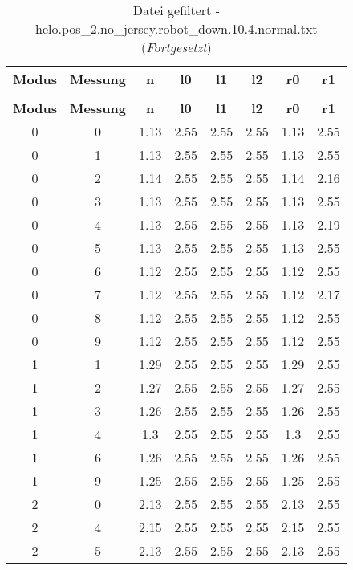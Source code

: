 \begin{longtable}{|c|c||c||c|c|c||c|c|}
	\caption{Datei gefiltert - helo.pos\_2.no\_jersey.robot\_down.10.4.normal.txt} \label{tab:helo.pos-2.no-jersey.robot-down.10.4.normal.txt} \\ \hline
	\textbf{Modus} & \textbf{Messung} & \textbf{n} & \textbf{l0} & \textbf{l1} & \textbf{l2} & \textbf{r0} & \textbf{r1}\\ \hline
	\endfirsthead
	\caption[]{Datei gefiltert - helo.pos\_2.no\_jersey.robot\_down.10.4.normal.txt (\emph{Fortgesetzt})} \\ \hline
	\textbf{Modus} & \textbf{Messung} & \textbf{n} & \textbf{l0} & \textbf{l1} & \textbf{l2} & \textbf{r0} & \textbf{r1}\\ \hline
	\endhead
	0 & 0 & 1.13 & 2.55 & 2.55 & 2.55 & 1.13 & 2.55 \\ \hline
	0 & 1 & 1.13 & 2.55 & 2.55 & 2.55 & 1.13 & 2.55 \\ \hline
	0 & 2 & 1.14 & 2.55 & 2.55 & 2.55 & 1.14 & 2.16 \\ \hline
	0 & 3 & 1.13 & 2.55 & 2.55 & 2.55 & 1.13 & 2.55 \\ \hline
	0 & 4 & 1.13 & 2.55 & 2.55 & 2.55 & 1.13 & 2.19 \\ \hline
	0 & 5 & 1.13 & 2.55 & 2.55 & 2.55 & 1.13 & 2.55 \\ \hline
	0 & 6 & 1.12 & 2.55 & 2.55 & 2.55 & 1.12 & 2.55 \\ \hline
	0 & 7 & 1.12 & 2.55 & 2.55 & 2.55 & 1.12 & 2.17 \\ \hline
	0 & 8 & 1.12 & 2.55 & 2.55 & 2.55 & 1.12 & 2.55 \\ \hline
	0 & 9 & 1.12 & 2.55 & 2.55 & 2.55 & 1.12 & 2.55 \\ \hline
	1 & 1 & 1.29 & 2.55 & 2.55 & 2.55 & 1.29 & 2.55 \\ \hline
	1 & 2 & 1.27 & 2.55 & 2.55 & 2.55 & 1.27 & 2.55 \\ \hline
	1 & 3 & 1.26 & 2.55 & 2.55 & 2.55 & 1.26 & 2.55 \\ \hline
	1 & 4 & 1.3 & 2.55 & 2.55 & 2.55 & 1.3 & 2.55 \\ \hline
	1 & 6 & 1.26 & 2.55 & 2.55 & 2.55 & 1.26 & 2.55 \\ \hline
	1 & 9 & 1.25 & 2.55 & 2.55 & 2.55 & 1.25 & 2.55 \\ \hline
	2 & 0 & 2.13 & 2.55 & 2.55 & 2.55 & 2.13 & 2.55 \\ \hline
	2 & 4 & 2.15 & 2.55 & 2.55 & 2.55 & 2.15 & 2.55 \\ \hline
	2 & 5 & 2.13 & 2.55 & 2.55 & 2.55 & 2.13 & 2.55 \\ \hline

\end{longtable}

